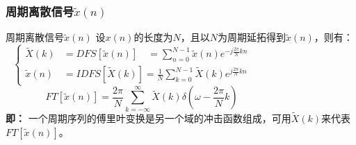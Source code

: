 \documentclass[notheorems,compress,mathserif,table]{beamer}
\begin{document}
%



\begin{frame}[shrink]\frametitle{周期离散信号$\tilde{x}(n)$}%

   周期离散信号$\tilde{x}(n)$
        \newline\newline\newline\newline\newline\newline
        设$x(n)$的长度为$N$，且以$N$为周期延拓得到$\tilde{x}(n)$，则有：
        \begin{equation}
           \left\{ \begin{aligned}
               \tilde{X}(k) &= DFS[\tilde{x}(n)]\quad  = \sum_{n=0}^{N-1}\tilde{x}(n)e^{-j\frac{2\pi}{N}kn}
                              \quad\quad\quad\quad\quad\quad\quad\quad\quad\quad \\
               \tilde{x}(n) &= IDFS[\tilde{X}(k)]
                               = \frac{1}{N}\sum_{k=0}^{N-1}\tilde{X}(k)e^{j\frac{2\pi}{N}kn}
           \end{aligned} \right.
        \end{equation}
        $$FT[\tilde{x}(n)] =  \frac{2\pi}{N}\sum_{k=-\infty}^{\infty}\tilde{X}(k)\delta(\omega-\frac{2\pi}{N}k) \qquad\qquad\qquad\qquad$$
        \textbf{即：} 一个周期序列的傅里叶变换是另一个域的冲击函数组成，可用$\tilde{X}(k)$来代表$FT[\tilde{x}(n)]$。\par
\end{frame}
\end{document}
